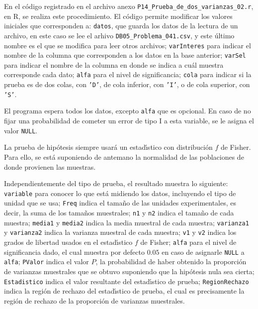 \begin{solucion}
 En el c\'odigo registrado en el archivo anexo
 \texttt{P14\_Prueba\_de\_dos\_varianzas\_02.r}, en R,
 se realiza este procedimiento.
 El c\'odigo permite modificar los valores iniciales
 que corresponden a:
 \texttt{datos}, que guarda los datos de la lectura
 de un archivo,
 en este caso se lee el arhivo \texttt{DB05\_Problema\_041.csv},
 y este \'ultimo nombre es el que se modifica 
 para leer otros archivos;
 \texttt{varInteres} para indicar el nombre de la columna
 que corresponden a los datos en la base anterior;
 \texttt{varSel} para indicar el nombre de la columna
 en donde se indica a cu\'al muestra corresponde cada dato;
 \texttt{alfa} para el nivel de significancia;
 \texttt{cola} para indicar si la prueba es de dos colas,
 con \texttt{'D'}, de cola inferior, con \texttt{'I'},
 o de cola superior, con \texttt{'S'}.
 \par 
 El programa espera todos los datos, excepto \texttt{alfa} que es opcional.
 En caso de no fijar una probabilidad de cometer un error de tipo I
 a esta variable, se le asigna el valor \texttt{NULL}.
 \par 
 La prueba de hip\'otesis siempre usar\'a un estad\'{\i}stico
 con distribuci\'on $f$ de Fisher.
 Para ello, se est\'a suponiendo de antemano la normalidad
 de las poblaciones de donde provienen las muestras.
 \par 
 Independientemente del tipo de prueba, el resultado muestra lo siguiente:
 \texttt{variable} para conocer lo que est\'a midiendo los datos,
 incluyendo el tipo de unidad que se usa;
 \texttt{Freq} indica el tama\~no de las unidades experimentales,
 es decir, la suma de los tama\~nos muestrales;
 \texttt{n1} y \texttt{n2} indica el tama\~no de cada muestra;
 \texttt{media1} y \texttt{media2} indica la media muestral de cada muestra;
 \texttt{varianza1} y \texttt{varianza2} indica la varianza muestral
 de cada muestra;
 \texttt{v1} y \texttt{v2} indica los grados de libertad usados
 en el estad\'{\i}stico $f$ de Fisher;
 \texttt{alfa} para el nivel de significancia dado,
 el cual muestra por defecto $0.05$
 en caso de asignarle \texttt{NULL} a \texttt{alfa};
 \texttt{PValor} indica el valor $P$, la probabilidad
 de haber obtenido la proporci\'on de varianzas muestrales
 que se obtuvo suponiendo que la hip\'otesis nula sea cierta;
 \texttt{Estadistico} indica el valor resultante
 del estad\'{\i}stico de prueba;
 \texttt{RegionRechazo} indica la regi\'on de rechazo del estad\'{\i}stico
 de prueba, el cual es precisamente la regi\'on de rechazo de la proporci\'on
 de varianzas muestrales.
 \par 

\end{solucion}
